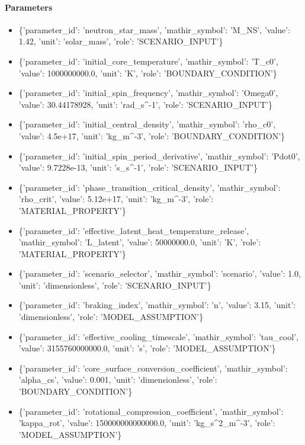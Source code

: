 \documentclass[11pt]{article}
\begin{document}
\paragraph{Parameters}
\begin{itemize}
\item \{'parameter\_id': 'neutron\_star\_mass', 'mathir\_symbol': 'M\_NS', 'value': 1.42, 'unit': 'solar\_mass', 'role': 'SCENARIO\_INPUT'\}
\item \{'parameter\_id': 'initial\_core\_temperature', 'mathir\_symbol': 'T\_c0', 'value': 1000000000.0, 'unit': 'K', 'role': 'BOUNDARY\_CONDITION'\}
\item \{'parameter\_id': 'initial\_spin\_frequency', 'mathir\_symbol': 'Omega0', 'value': 30.44178928, 'unit': 'rad\_s\textasciicircum{}-1', 'role': 'SCENARIO\_INPUT'\}
\item \{'parameter\_id': 'initial\_central\_density', 'mathir\_symbol': 'rho\_c0', 'value': 4.5e+17, 'unit': 'kg\_m\textasciicircum{}-3', 'role': 'BOUNDARY\_CONDITION'\}
\item \{'parameter\_id': 'initial\_spin\_period\_derivative', 'mathir\_symbol': 'Pdot0', 'value': 9.7228e-13, 'unit': 's\_s\textasciicircum{}-1', 'role': 'SCENARIO\_INPUT'\}
\item \{'parameter\_id': 'phase\_transition\_critical\_density', 'mathir\_symbol': 'rho\_crit', 'value': 5.12e+17, 'unit': 'kg\_m\textasciicircum{}-3', 'role': 'MATERIAL\_PROPERTY'\}
\item \{'parameter\_id': 'effective\_latent\_heat\_temperature\_release', 'mathir\_symbol': 'L\_latent', 'value': 50000000.0, 'unit': 'K', 'role': 'MATERIAL\_PROPERTY'\}
\item \{'parameter\_id': 'scenario\_selector', 'mathir\_symbol': 'scenario', 'value': 1.0, 'unit': 'dimensionless', 'role': 'SCENARIO\_INPUT'\}
\item \{'parameter\_id': 'braking\_index', 'mathir\_symbol': 'n', 'value': 3.15, 'unit': 'dimensionless', 'role': 'MODEL\_ASSUMPTION'\}
\item \{'parameter\_id': 'effective\_cooling\_timescale', 'mathir\_symbol': 'tau\_cool', 'value': 3155760000000.0, 'unit': 's', 'role': 'MODEL\_ASSUMPTION'\}
\item \{'parameter\_id': 'core\_surface\_conversion\_coefficient', 'mathir\_symbol': 'alpha\_cs', 'value': 0.001, 'unit': 'dimensionless', 'role': 'BOUNDARY\_CONDITION'\}
\item \{'parameter\_id': 'rotational\_compression\_coefficient', 'mathir\_symbol': 'kappa\_rot', 'value': 150000000000000.0, 'unit': 'kg\_s\textasciicircum{}2\_m\textasciicircum{}-3', 'role': 'MODEL\_ASSUMPTION'\}
\end{itemize}
\end{document}
